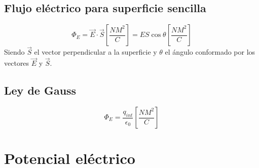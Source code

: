 \documentclass{report}
\begin{document}
    \subsection*{Flujo eléctrico para superficie sencilla}
      \begin{equation*}
        \Phi_E=\overrightarrow{E}\cdot\overrightarrow{S}\left[\frac{NM^2}{C}\right]=ES\cos{\theta}\left[\frac{NM^2}{C}\right]
      \end{equation*}
    Siendo $\overrightarrow{S}$ el vector perpendicular a la superficie y $\theta$ el ángulo conformado por los vectores
    $\overrightarrow{E}$ y $\overrightarrow{S}$.
    \subsection*{Ley de Gauss}
      \begin{equation*}
        \Phi_E=\frac{q_{int}}{\epsilon_0}\left[\frac{NM^2}{C}\right]
      \end{equation*}
  \section*{Potencial eléctrico}
\end{document}
